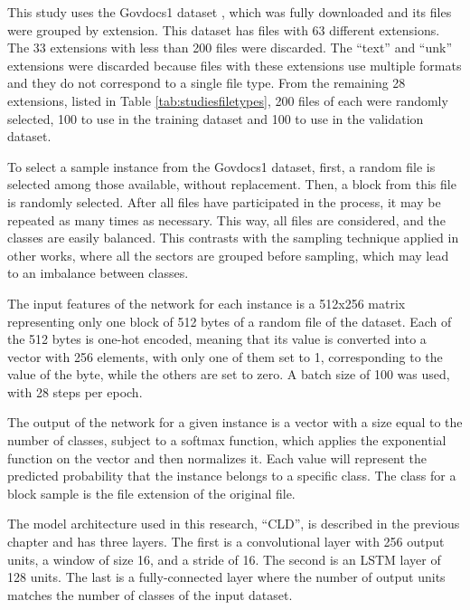 
This study uses the Govdocs1 dataset \cite{garfinkel_bringing_2009}, which was fully downloaded and its files were grouped by extension. This dataset has files with 63 different extensions. The 33 extensions with less than 200 files were discarded. The  ``text'' and ``unk'' extensions were discarded because files with these extensions use multiple formats and they do not correspond to a single file type. From the remaining 28 extensions, listed in Table \ref{tab:studiesfiletypes}, 200 files of each were randomly selected, 100 to use in the training dataset and 100 to use in the validation dataset.

% 

To select a sample instance from the Govdocs1 dataset, first, a random file is selected among those available, without replacement. Then, a block from this file is randomly selected. After all files have participated in the process, it may be repeated as many times as necessary. This way, all files are considered, and the classes are easily balanced.
This contrasts with the sampling technique applied in other works, where all the sectors are grouped before sampling, which may lead to an imbalance between classes.

The input features of the network for each instance is a 512x256 matrix representing only one block of 512 bytes of a random file of the dataset. Each of the 512 bytes is one-hot encoded, meaning that its value is converted into a vector with 256 elements, with only one of them set to 1, corresponding to the value of the byte, while the others are set to zero. A batch size of 100 was used, with 28 steps per epoch.

The output of the network for a given instance is a vector with a size equal to the number of classes, subject to a softmax function, which applies the exponential function on the vector and then normalizes it. Each value will represent the predicted probability that the instance belongs to a specific class. The class for a block sample is the file extension of the original file.

The model architecture used in this research, ``CLD'', is described in the previous chapter and has three layers. The first is a convolutional layer with 256 output units, a window of size 16, and a stride of 16. The second is an LSTM layer of 128 units. The last is a fully-connected layer where the number of output units matches the number of classes of the input dataset.

